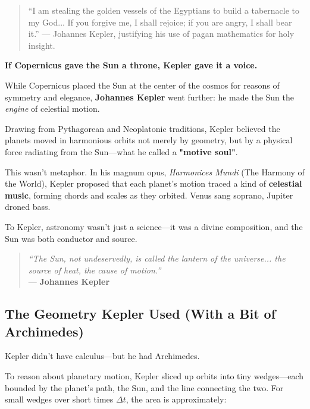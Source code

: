\begin{quote}
``I am stealing the golden vessels of the Egyptians to build a tabernacle to my God... If you forgive me, I shall rejoice; if you are angry, I shall bear it.''
— Johannes Kepler, justifying his use of pagan mathematics for holy insight.
\end{quote}

\begin{tcolorbox}[title=Kepler and the Singing Sun, colback=gray!5, colframe=black, fonttitle=\bfseries]

  \textbf{If Copernicus gave the Sun a throne, Kepler gave it a voice.}
  
  While Copernicus placed the Sun at the center of the cosmos for reasons of symmetry and elegance, \textbf{Johannes Kepler} went further: he made the Sun the \textit{engine} of celestial motion.
  
  Drawing from Pythagorean and Neoplatonic traditions, Kepler believed the planets moved in harmonious orbits not merely by geometry, but by a physical force radiating from the Sun—what he called a \textbf{"motive soul"}.
  
  This wasn’t metaphor. In his magnum opus, \textit{Harmonices Mundi} (The Harmony of the World), Kepler proposed that each planet’s motion traced a kind of \textbf{celestial music}, forming chords and scales as they orbited. Venus sang soprano, Jupiter droned bass.
  
  To Kepler, astronomy wasn’t just a science—it was a divine composition, and the Sun was both conductor and source.
  
  \begin{quote}
  \textit{“The Sun, not undeservedly, is called the lantern of the universe... the source of heat, the cause of motion.”} \\
  — \textbf{Johannes Kepler}
  \end{quote}
  
\end{tcolorbox}
  







\subsection{The Geometry Kepler Used (With a Bit of Archimedes)}

Kepler didn’t have calculus—but he had Archimedes.

To reason about planetary motion, Kepler sliced up orbits into tiny wedges—each bounded by the planet’s path, the Sun, and the line connecting the two. For small wedges over short times \( \Delta t \), the area is approximately:

